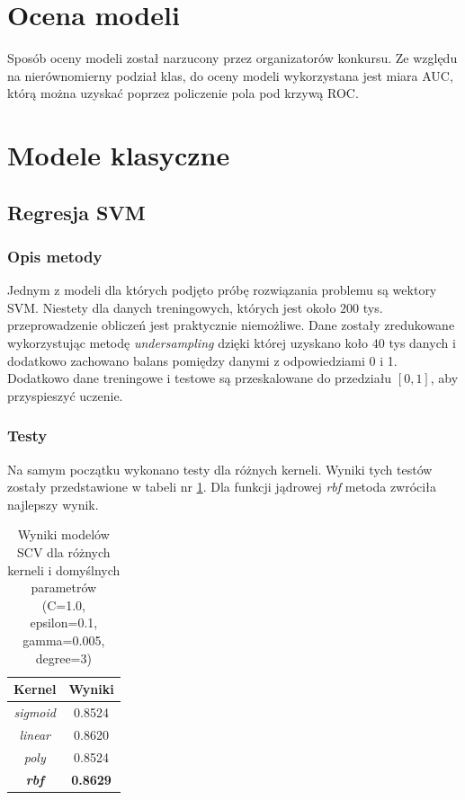 \documentclass[12pt]{article}
\begin{document}
\section{Ocena modeli}

Sposób oceny modeli został narzucony przez organizatorów konkursu. Ze względu na nierównomierny podział klas, do oceny modeli wykorzystana jest miara AUC, którą można uzyskać poprzez policzenie pola pod krzywą ROC.


\section{Modele klasyczne}

\subsection{Regresja SVM}
\subsubsection{Opis metody}
Jednym z modeli dla których podjęto próbę rozwiązania problemu są wektory SVM. Niestety dla danych treningowych, których jest około $200$ tys. przeprowadzenie obliczeń jest praktycznie niemożliwe. Dane zostały zredukowane wykorzystując metodę \textit{undersampling} dzięki której uzyskano koło $40$ tys danych i dodatkowo zachowano balans pomiędzy danymi z odpowiedziami 0 i 1. Dodatkowo dane treningowe i testowe są przeskalowane do przedziału $[0, 1]$, aby przyspieszyć uczenie.

\subsubsection{Testy}
Na samym początku wykonano testy dla różnych kerneli. Wyniki tych testów zostały przedstawione w tabeli nr \ref{tab:svm_kernels}. Dla funkcji jądrowej \textit{rbf} metoda zwróciła najlepszy wynik.
\begin{table}[H]
    \centering
    \begin{tabular}{|c|c|}
    \hline
    Kernel & Wyniki \\
    \hline
    \hline
    \textit{sigmoid} &	0.8524 \\
    \hline
    \textit{linear} &	0.8620 \\
    \hline
    \textit{poly} &	0.8524 \\
    \hline
    \textbf{\textit{rbf}} &	\textbf{0.8629} \\
    \hline
    \end{tabular}
    \caption{Wyniki modelów SCV dla różnych kerneli i domyślnych parametrów (C=1.0, epsilon=0.1, gamma=0.005, degree=3)}
    \label{tab:svm_kernels}
\end{table}
\end{document}
